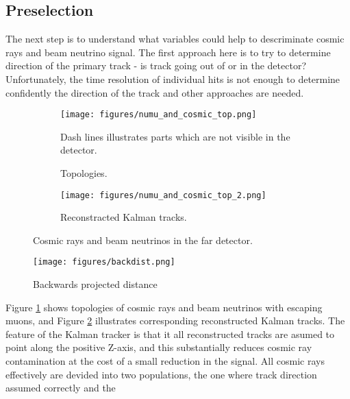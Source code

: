 \subsection{Preselection} \label{presel}
The next step is to understand what variables could help to descriminate cosmic rays and beam neutrino
signal. The first approach here is to try to determine direction of the primary track - is track going 
out of or in the detector? Unfortunately, the time resolution of individual hits is not enough to determine 
confidently the direction of the track and other approaches are needed. 
\begin{figure}[h]
\begin{subfigure}[t]{0.9\textwidth}
  \centering
  \texttt{[image: figures/numu\_and\_cosmic\_top.png]}
  \caption{Topologies.}
  {Dash lines illustrates parts which are not visible in the detector.}
  \label{fig:cosmic_top}
\end{subfigure}
\vspace{0.5cm}
\newline
\begin{subfigure}[t]{0.9\textwidth}
  \centering
  \texttt{[image: figures/numu\_and\_cosmic\_top\_2.png]}
  \caption{Reconstracted Kalman tracks.}
  \label{fig:cosmic_top_2}
\end{subfigure}
\caption{Cosmic rays and beam neutrinos in the far detector.}
\label{fig:top_and_reco_tracks}
\end{figure}
\newline
\newline
\begin{wrapfigure}{r}{0.5\textwidth}
\vspace{-15pt}
  \begin{center}
    \texttt{[image: figures/backdist.png]}
  \end{center}
\vspace{0.5mm}
\caption{Backwards projected distance}
\label{fig:bakdist}
\end{wrapfigure}
Figure \ref{fig:cosmic_top} shows topologies of cosmic rays and beam neutrinos with escaping muons, and Figure
\ref{fig:cosmic_top_2} illustrates corresponding reconstructed Kalman tracks. The feature of the Kalman 
tracker is that it all reconstructed tracks are asumed to point along the positive Z-axis, and this substantially 
reduces cosmic ray contamination at the cost of a small reduction in the signal. All cosmic 
rays effectively are devided into two populations, the one where track direction assumed correctly and the 
